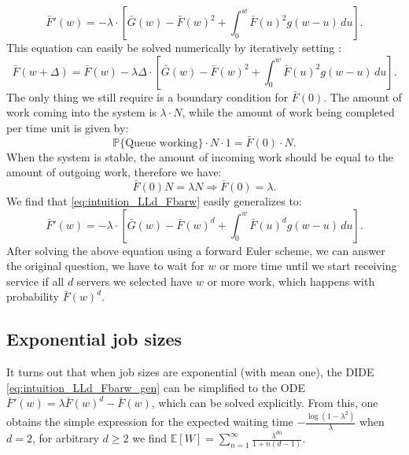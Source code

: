 \documentclass[12pt]{report}
\renewcommand{\P}{\mathbb{P}}
\newcommand{\E}{\mathbb{E}}
\renewcommand{\P}{\mathbb{P}}
\begin{document}
\begin{equation} \label{eq:intuition_LLd_Fbarw}
\bar F'(w) = - \lambda \cdot \left[ \bar G(w) - \bar F(w)^2 + \int_0^w \bar F(u)^2 g(w-u) \, du \right].
\end{equation}
This equation can easily be solved numerically by iteratively setting :
$$
\bar F(w+\Delta) = \bar F(w) - \lambda \Delta \cdot \left[ \bar G(w) - \bar F(w)^2 + \int_0^w \bar F(u) ^2 g(w-u) \, du \right].
$$
The only thing we still require is a boundary condition for $\bar F(0)$. The amount of work coming into the system is $\lambda \cdot N$, while the amount of work being completed per time unit is given by:
$$
\P\{\mbox{Queue working}\} \cdot N \cdot 1 = \bar F(0) \cdot N.
$$
When the system is stable, the amount of incoming work should be equal to the amount of outgoing work, therefore we have:
$$
\bar F(0) N = \lambda N \Rightarrow \bar F(0) = \lambda.
$$
We find that \eqref{eq:intuition_LLd_Fbarw} easily generalizes to:
\begin{equation} \label{eq:intuition_LLd_Fbarw_gen}
\bar F'(w) = - \lambda \cdot \left[ \bar G(w) - \bar F(w)^d + \int_0^w \bar F(u)^d g(w-u) \, du \right].
\end{equation}
After solving the above equation using a forward Euler scheme, we can answer the original question, we have to wait for $w$ or more time until we start receiving service if all $d$ servers we selected have $w$ or more work, which happens with probability $\bar F(w)^d$.
\subsection{Exponential job sizes}
It turns out that when job sizes are exponential (with mean one), the DIDE \eqref{eq:intuition_LLd_Fbarw_gen} can be simplified to the ODE $\bar F'(w) = \lambda \bar F(w)^d - \bar F(w)$, which can be solved explicitly. From this, one obtains the simple expression for the expected waiting time $-\frac{\log(1-\lambda^2)}{\lambda}$ when $d=2$, for arbitrary $d\geq 2$ we find $\E[W]=\sum_{n=1}^\infty \frac{\lambda^{dn}}{1+n(d-1)}$.
\end{document}
